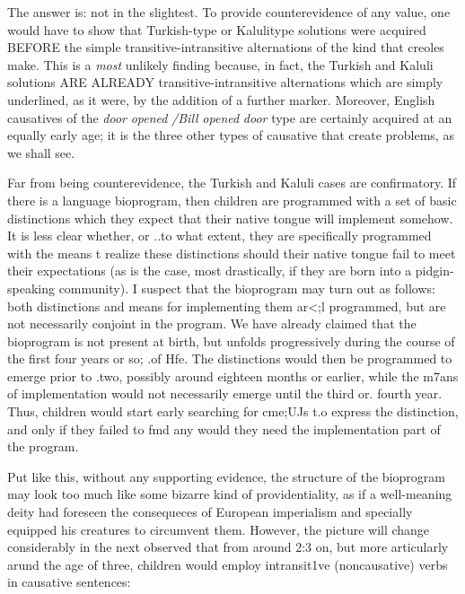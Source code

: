 The answer is: not in the slightest. To provide counterevidence of any value, one would have to show that Turkish-type or Kaluli\-type solutions were acquired BEFORE the simple transitive-intransitive alternations of the kind that creoles make. This is a \textit{most} unlikely finding because, in fact, the Turkish and Kaluli solutions ARE AL\-READY transitive-intransitive alternations which are simply under\-lined, as it were, by the addition of a further marker. Moreover, English causatives of the \textit{door} \textit{opened} \textit{/Bill} \textit{opened} \textit{door} type are certainly acquired at an equally early age; it is the three other types of causative that create problems, as we shall see.

Far from being counterevidence, the Turkish and Kaluli cases are confirmatory. If there is a language bioprogram, then children are programmed with a set of basic distinctions which they expect that their native tongue will implement somehow. It is less clear whether, or ..to what extent, they are specifically programmed with the means t realize these distinctions should their native tongue fail to meet their expectations (as is the case, most drastically, if they are born into a pidgin-speaking community). I suspect that the bioprogram may turn out as follows: both distinctions and means for implementing them ar{\textless};l programmed, but are not necessarily conjoint in the program. We have already claimed that the bioprogram is not present at birth, but unfolds progressively during the course of the first four years or
so; .of Hfe. The distinctions would then be programmed to emerge
prior to .two, possibly around eighteen months or earlier, while the m7ans of implementation would not necessarily emerge until the
third or. fourth year. Thus, children would start early searching for cme;UJs t.o express the distinction, and only if they failed to fmd any
would they need the implementation part of the program.


Put like this, without any supporting evidence, the structure of the bioprogram may look too much like some bizarre kind of provi\-dentiality, as if a well-meaning deity had foreseen the consequeces of European imperialism and specially equipped his creatures to circum\-vent them. However, the picture will change considerably in the next
\citet{Bowerman1974} observed that from around 2:3 on, but more
articularly arund the age of three, children would employ intransi\-t1ve (noncausative) verbs in causative sentences:

